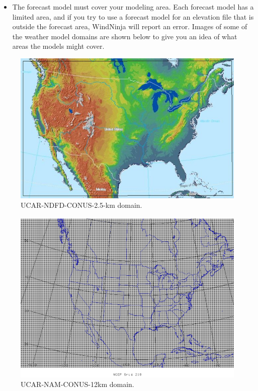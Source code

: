\documentclass[12pt]{article}
\begin{document}
\begin{itemize}
\item The forecast model must cover your modeling area.  Each forecast model has a limited area, and if you try to use a forecast model for an elevation file that is outside the forecast area, WindNinja will report an error.  Images of some of the weather model domains are shown below to give you an idea of what areas the models might cover.
\end{itemize}

\begin{figure}[H]
	\centering
	\label{UCAR_NDFD_Domain}
	\includegraphics[scale=1.0]{NDFD_domain}
	\caption*{UCAR-NDFD-CONUS-2.5-km domain.}
\end{figure}
\begin{figure}[H]
	\centering
	\label{UCAR_NDFD_Domain}
	\includegraphics[scale=0.30]{NAM_1}
	\caption*{UCAR-NAM-CONUS-12km domain.}
\end{figure}
\end{document}
